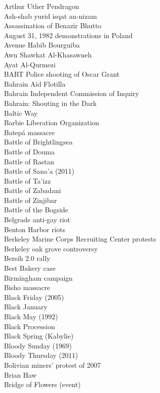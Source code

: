Arthur Uther Pendragon\\
Ash-shab yurid isqat an-nizam\\
Assassination of Benazir Bhutto\\
August 31, 1982 demonstrations in Poland\\
Avenue Habib Bourguiba\\
Awn Shawkat Al-Khasawneh\\
Ayat Al-Qurmezi\\
BART Police shooting of Oscar Grant\\
Bahrain Aid Flotilla\\
Bahrain Independent Commission of Inquiry\\
Bahrain: Shouting in the Dark\\
Baltic Way\\
Barbie Liberation Organization\\
Batepá massacre\\
Battle of Brightlingsea\\
Battle of Douma\\
Battle of Rastan\\
Battle of Sana'a (2011)\\
Battle of Ta'izz\\
Battle of Zabadani\\
Battle of Zinjibar\\
Battle of the Bogside\\
Belgrade anti-gay riot\\
Benton Harbor riots\\
Berkeley Marine Corps Recruiting Center protests\\
Berkeley oak grove controversy\\
Bersih 2.0 rally\\
Best Bakery case\\
Birmingham campaign\\
Bisho massacre\\
Black Friday (2005)\\
Black January\\
Black May (1992)\\
Black Procession\\
Black Spring (Kabylie)\\
Bloody Sunday (1969)\\
Bloody Thursday (2011)\\
Bolivian miners' protest of 2007\\
Brian Haw\\
Bridge of Flowers (event)\\
